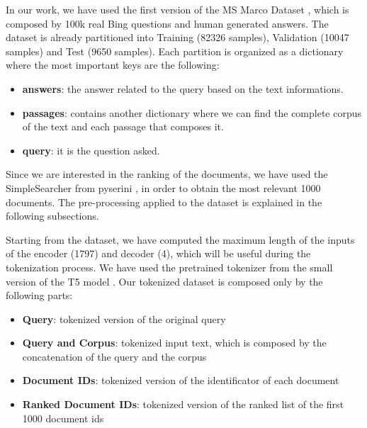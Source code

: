 In our work, we have used the first version of the MS Marco Dataset \cite{bajaj2018msmarcohumangenerated}, which is composed by 100k real Bing questions and human generated answers. The dataset is already partitioned into Training (82326 samples), Validation (10047 samples) and Test (9650 samples). Each partition is organized as a dictionary where the most important keys are the following:
\begin{itemize}
    \item \textbf{answers}: the answer related to the query based on the text informations.
    \item \textbf{passages}: contains another dictionary where we can find the complete corpus of the text and each passage that composes it.
    \item \textbf{query}: it is the question asked.
\end{itemize}
Since we are interested in the ranking of the documents, we have used the SimpleSearcher from pyserini \cite{pyserini}, in order to obtain the most relevant 1000 documents. 
The pre-processing applied to the dataset is explained in the following subsections.

Starting from the dataset, we have computed the maximum length of the inputs of the encoder (1797) and decoder (4), which will be useful during the tokenization process. We have used the pretrained tokenizer from the small version of the T5 model \cite{raffel2023exploringlimitstransferlearning}. Our tokenized dataset is composed only by the following parts:
\begin{itemize}
    \item \textbf{Query}: tokenized version of the original query
    \item \textbf{Query and Corpus}: tokenized input text, which is composed by the concatenation of the query and the corpus
    \item \textbf{Document IDs}: tokenized version of the identificator of each document
    \item \textbf{Ranked Document IDs}: tokenized version of the ranked list of the first 1000 document ids
\end{itemize}
